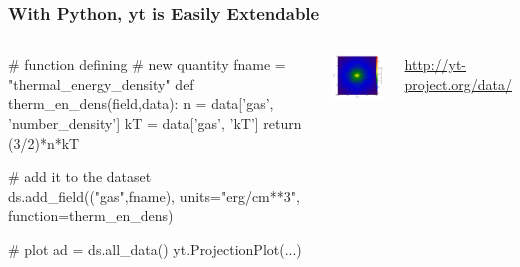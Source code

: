 \documentclass[]{beamer}
\begin{document}
\begin{frame}[fragile]
  \frametitle{With Python, yt is Easily Extendable}
  \begin{columns}
    \column{7cm}
\begin{python}
# function defining 
# new quantity
fname = "thermal_energy_density"
def therm_en_dens(field,data):
    n = data['gas', 
             'number_density']
    kT = data['gas', 'kT']
    return (3/2)*n*kT

# add it to the dataset
ds.add_field(("gas",fname), 
             units="erg/cm**3", 
        function=therm_en_dens)

# plot
ad = ds.all_data()
yt.ProjectionPlot(...)
\end{python}
    \column{5cm}
    \begin{center}
      \includegraphics[width=5cm]{figures/isolated_galaxy_thermal_energy_density.pdf}
    \end{center}
    \begin{flushright}
      {\footnotesize\url{http://yt-project.org/data/}}
    \end{flushright}
  \end{columns}
\end{frame}
\end{document}
